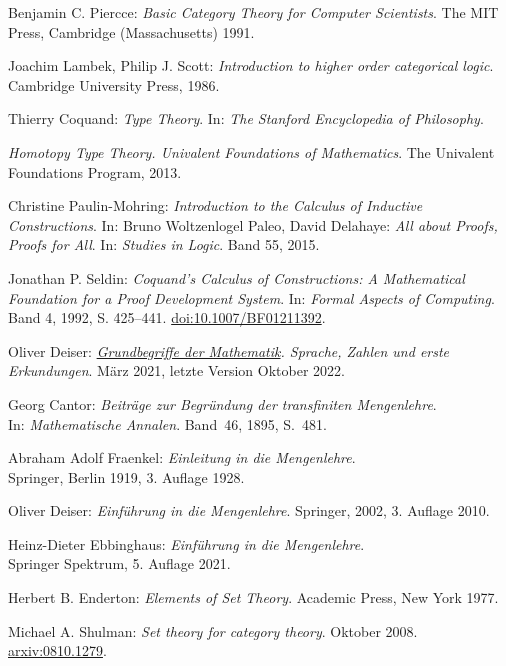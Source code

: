 \begin{thebibliography}{00}
 Benjamin C. Piercce:
\emph{Basic Category Theory for Computer Scientists}.
The MIT Press, Cambridge (Massachusetts) 1991.

 Joachim Lambek, Philip J. Scott:
\emph{Introduction to higher order categorical logic}.
Cambridge University Press, 1986.

 Thierry Coquand:
\emph{Type Theory}. In: \emph{The Stanford Encyclopedia of Philosophy}.

\emph{Homotopy Type Theory. Univalent Foundations of Mathematics}.
The Univalent Foundations Program, 2013.

 Christine Paulin-Mohring:
\emph{Introduction to the Calculus of Inductive Constructions}. In:
Bruno Woltzenlogel Paleo, David Delahaye: \emph{All about Proofs, Proofs for All}.
In: \emph{Studies in Logic}. Band 55, 2015.

 Jonathan P. Seldin:
\emph{Coquand's Calculus of Constructions: A Mathematical Foundation
for a Proof Development System}. In: \emph{Formal Aspects of Computing}.
Band 4, 1992, S. 425--441.
\href{https://doi.org/10.1007/BF01211392}{doi:10.1007/BF01211392}.

Oliver Deiser:
\emph{\href{https://www.aleph1.info/?call=Puc&permalink=grundbegriffe}%
{Grundbegriffe der Mathematik}. Sprache, Zahlen und erste
Erkundungen}. März 2021, letzte Version Oktober 2022.

 Georg Cantor:
\emph{Beiträge zur Begründung der transfiniten Mengenlehre}.\\
In: \emph{Mathematische Annalen}. Band~46, 1895, S.~481.

 Abraham Adolf Fraenkel:
\emph{Einleitung in die Mengenlehre}.\\
Springer, Berlin 1919, 3. Auflage 1928.

 Oliver Deiser:
\emph{Einführung in die Mengenlehre}.
Springer, 2002, 3. Auflage 2010.

 Heinz-Dieter Ebbinghaus:
\emph{Einführung in die Mengenlehre}.\\
Springer Spektrum, 5. Auflage 2021.

 Herbert B. Enderton:
\emph{Elements of Set Theory}. Academic Press, New York 1977.

 Michael A. Shulman:
\emph{Set theory for category theory}.
Oktober 2008.\\
\href{https://arxiv.org/abs/0810.1279}{arxiv:0810.1279}.


\end{thebibliography}
